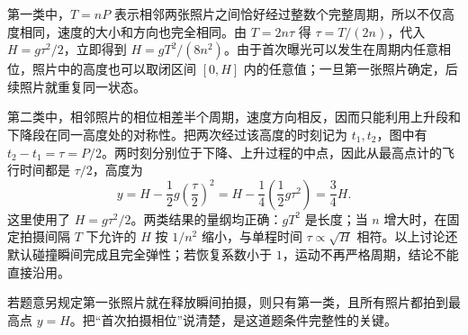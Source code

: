 \begin{xesolution}
第一类中，$T=nP$ 表示相邻两张照片之间恰好经过整数个完整周期，所以不仅高度相同，速度的大小和方向也完全相同。由
$T=2n\tau$ 得 $\tau=T/(2n)$，代入 $H=g\tau^2/2$，立即得到
$H=gT^2/(8n^2)$。由于首次曝光可以发生在周期内任意相位，照片中的高度也可以取闭区间 $[0,H]$ 内的任意值；一旦第一张照片确定，后续照片就重复同一状态。

第二类中，相邻照片的相位相差半个周期，速度方向相反，因而只能利用上升段和下降段在同一高度处的对称性。把两次经过该高度的时刻记为 $t_1,t_2$，图中有
$t_2-t_1=\tau=P/2$。两时刻分别位于下降、上升过程的中点，因此从最高点计的飞行时间都是 $\tau/2$，高度为
\[
 y=H-\frac12g\left(\frac{\tau}{2}\right)^2
  =H-\frac14\left(\frac12g\tau^2\right)=\frac34H.
\]
这里使用了 $H=g\tau^2/2$。两类结果的量纲均正确：$gT^2$ 是长度；当 $n$ 增大时，在固定拍摄间隔 $T$ 下允许的 $H$ 按 $1/n^2$ 缩小，与单程时间 $\tau\propto\sqrt H$ 相符。以上讨论还默认碰撞瞬间完成且完全弹性；若恢复系数小于 $1$，运动不再严格周期，结论不能直接沿用。

若题意另规定第一张照片就在释放瞬间拍摄，则只有第一类，且所有照片都拍到最高点 $y=H$。把“首次拍摄相位”说清楚，是这道题条件完整性的关键。
\end{xesolution}
